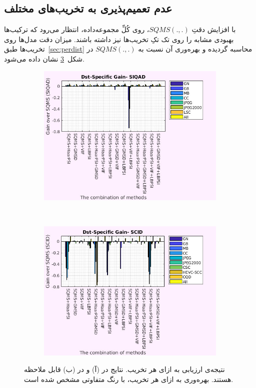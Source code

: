 \documentclass[twocolumn]{article}
\begin{document}
\subsection{عدم تعمیم‌پذیری به تخریب‌های مختلف} \label{sec:gen_dst}
با افزایش دقتِ $SQMS(., .)$، روی کُلِّ مجموعه‌داده، انتظار می‌رود که ترکیب‌ها بهبودی مشابه را روی تک تکِ تخریب‌ها نیز داشته باشند. میزان دقت مدل‌ها روی تخریب‌ها طبق~\ref{sec:perdist} محاسبه گردیده و بهره‌وری آن نسبت به $SQMS(.,.)$ در شکل~\ref{fig:res_per_distortion} نشان داده می‌شود.
\begin{figure}
	\begin{subfigure}{0.47\textwidth}
		\includegraphics[width=\textwidth]{per_distortion_SIQAD}
		\caption{}
		\label{fig:res_per_distortion_SIQAD}
	\end{subfigure} \\
	\begin{subfigure}{0.47\textwidth}
		\includegraphics[width=\textwidth]{per_distortion_SCID}
		\caption{}
		\label{fig:res_per_distortion_SCID}
	\end{subfigure}
	\caption{نتیجه‌ی ارزیابی به ازای هر تخریب. نتایج  در (آ) و  در (ب) قابل ملاحظه هستند. بهره‌وری به ازای هر تخریب، با رنگ متفاوتی مشخص شده است.}
	\label{fig:res_per_distortion}
\end{figure}
\end{document}
